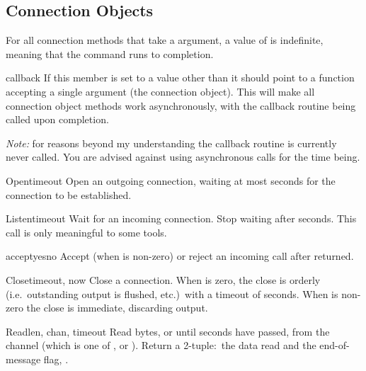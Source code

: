 \subsection{Connection Objects \label{connection-object}}

For all connection methods that take a  argument, a value
of  is indefinite, meaning that the command runs to completion.

\begin{memberdesc}[connection]{callback}
If this member is set to a value other than  it should point
to a function accepting a single argument (the connection
object). This will make all connection object methods work
asynchronously, with the callback routine being called upon
completion.

\emph{Note:} for reasons beyond my understanding the callback routine
is currently never called. You are advised against using asynchronous
calls for the time being.
\end{memberdesc}


\begin{methoddesc}[connection]{Open}{timeout}
Open an outgoing connection, waiting at most  seconds for
the connection to be established.
\end{methoddesc}

\begin{methoddesc}[connection]{Listen}{timeout}
Wait for an incoming connection. Stop waiting after 
seconds. This call is only meaningful to some tools.
\end{methoddesc}

\begin{methoddesc}[connection]{accept}{yesno}
Accept (when  is non-zero) or reject an incoming call after
 returned.
\end{methoddesc}

\begin{methoddesc}[connection]{Close}{timeout, now}
Close a connection. When  is zero, the close is orderly
(i.e.\ outstanding output is flushed, etc.)\ with a timeout of
 seconds. When  is non-zero the close is
immediate, discarding output.
\end{methoddesc}

\begin{methoddesc}[connection]{Read}{len, chan, timeout}
Read  bytes, or until  seconds have passed, from 
the channel  (which is one of ,
 or ). Return a 2-tuple:\ the data
read and the end-of-message flag, .
\end{methoddesc}

